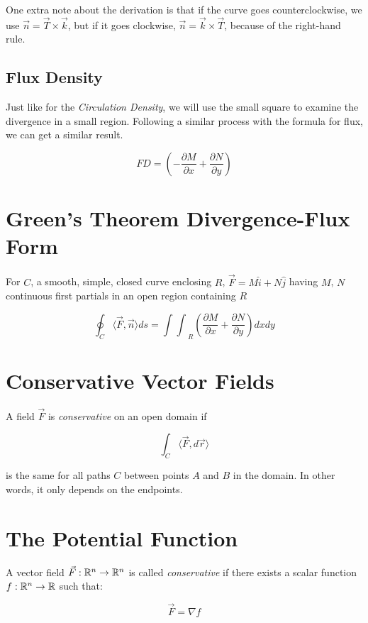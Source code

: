 One extra note about the derivation is that if the curve goes counterclockwise, we use 
\(\vec{n} = \vec{T} \times \vec{k}\), but if it goes clockwise, \(\vec{n} = \vec{k} \times \vec{T}\), because of the right-hand rule.


\subsection{Flux Density}

Just like for the \emph{Circulation Density}, we will use the small square to examine the divergence in a small region. Following a similar process 
with the formula for flux, we can get a similar result.

\[
   FD = \left(-\frac{\partial M}{\partial x} + \frac{\partial N}{\partial y}\right)  
\]

\section{Green's Theorem Divergence-Flux Form}

For \(C\), a smooth, simple, closed curve enclosing \(R\), \(\vec{F} = M \hat{i} + N \hat{j}\) having \(M\), \(N\) continuous first partials in an open region 
containing \(R\)

\[
    \oint_C \langle \vec{F}, \vec{n} \rangle ds = {\int\int}_{R}  
    \left(\frac{\partial M}{\partial x} + \frac{\partial N}{\partial y}\right) dx dy  
\]

\section{Conservative Vector Fields}

A field \(\vec{F}\) is \emph{conservative} on an open domain if 

\[
    \int_C \langle \vec{F}, d\vec{r} \rangle
\]

is the same for all paths \(C\) between points \(A\) and \(B\) in the domain. In other words, it 
only depends on the endpoints.

\section{The Potential Function}

A vector field \( \vec{F} : \mathbb{R}^n \to \mathbb{R}^n \) is called \emph{conservative} if there exists a 
scalar function \( f : \mathbb{R}^n \to \mathbb{R} \) such that:

\[
    \vec{F} = \nabla f
\]

